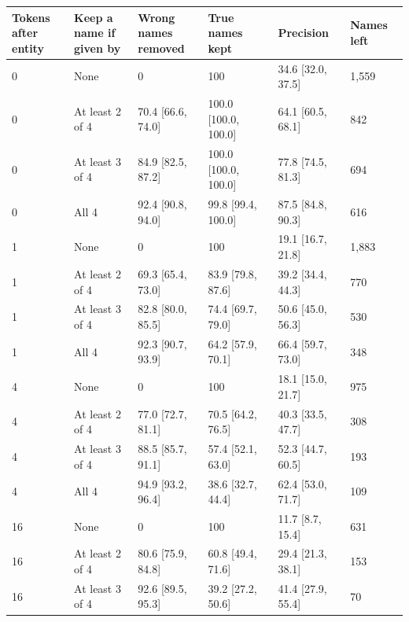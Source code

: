 \begin{tabular}{@{}llllll@{}}
\toprule
\shortstack[l]{Tokens after\\entity} & \shortstack[l]{Keep a name if\\given by} & \shortstack[l]{Wrong names\\removed} & \shortstack[l]{True names\\kept} & Precision & Names left \\
\midrule
0 & None & 0 & 100 & 34.6 {\scriptsize[32.0, 37.5]} & 1{,}559 \\
0 & At least 2 of 4 & 70.4 {\scriptsize[66.6, 74.0]} & 100.0 {\scriptsize[100.0, 100.0]} & 64.1 {\scriptsize[60.5, 68.1]} & 842 \\
0 & At least 3 of 4 & 84.9 {\scriptsize[82.5, 87.2]} & 100.0 {\scriptsize[100.0, 100.0]} & 77.8 {\scriptsize[74.5, 81.3]} & 694 \\
0 & All 4 & 92.4 {\scriptsize[90.8, 94.0]} & 99.8 {\scriptsize[99.4, 100.0]} & 87.5 {\scriptsize[84.8, 90.3]} & 616 \\
1 & None & 0 & 100 & 19.1 {\scriptsize[16.7, 21.8]} & 1{,}883 \\
1 & At least 2 of 4 & 69.3 {\scriptsize[65.4, 73.0]} & 83.9 {\scriptsize[79.8, 87.6]} & 39.2 {\scriptsize[34.4, 44.3]} & 770 \\
1 & At least 3 of 4 & 82.8 {\scriptsize[80.0, 85.5]} & 74.4 {\scriptsize[69.7, 79.0]} & 50.6 {\scriptsize[45.0, 56.3]} & 530 \\
1 & All 4 & 92.3 {\scriptsize[90.7, 93.9]} & 64.2 {\scriptsize[57.9, 70.1]} & 66.4 {\scriptsize[59.7, 73.0]} & 348 \\
4 & None & 0 & 100 & 18.1 {\scriptsize[15.0, 21.7]} & 975 \\
4 & At least 2 of 4 & 77.0 {\scriptsize[72.7, 81.1]} & 70.5 {\scriptsize[64.2, 76.5]} & 40.3 {\scriptsize[33.5, 47.7]} & 308 \\
4 & At least 3 of 4 & 88.5 {\scriptsize[85.7, 91.1]} & 57.4 {\scriptsize[52.1, 63.0]} & 52.3 {\scriptsize[44.7, 60.5]} & 193 \\
4 & All 4 & 94.9 {\scriptsize[93.2, 96.4]} & 38.6 {\scriptsize[32.7, 44.4]} & 62.4 {\scriptsize[53.0, 71.7]} & 109 \\
16 & None & 0 & 100 & 11.7 {\scriptsize[8.7, 15.4]} & 631 \\
16 & At least 2 of 4 & 80.6 {\scriptsize[75.9, 84.8]} & 60.8 {\scriptsize[49.4, 71.6]} & 29.4 {\scriptsize[21.3, 38.1]} & 153 \\
16 & At least 3 of 4 & 92.6 {\scriptsize[89.5, 95.3]} & 39.2 {\scriptsize[27.2, 50.6]} & 41.4 {\scriptsize[27.9, 55.4]} & 70 \\

\end{tabular}
